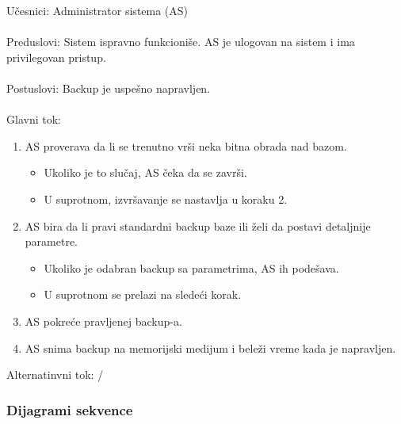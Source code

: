 \label{su: backup}
\noindent U\v cesnici: Administrator sistema (AS)
\\
\\ Preduslovi: Sistem ispravno funkcioni\v se. AS je ulogovan na sistem i ima privilegovan pristup.
\\
\\ Postuslovi: Backup je uspe\v sno napravljen.
\\
\\ Glavni tok:
\begin{enumerate}
	\item AS proverava da li se trenutno vr\v si neka bitna obrada nad bazom.
	\begin{itemize}
		\item Ukoliko je to slu\v caj, AS \v ceka da se zavr\v si.
		\item U suprotnom, izvr\v savanje se nastavlja u koraku 2.
	\end{itemize}
	\item AS bira da li pravi standardni backup baze ili \v zeli da postavi detaljnije parametre.
	\begin{itemize}
		\item Ukoliko je odabran backup sa parametrima, AS ih pode\v sava.
		\item U suprotnom se prelazi na slede\' ci korak.
	\end{itemize}
	\item AS pokre\' ce pravljenej backup-a.
	\item AS snima backup na memorijski medijum i bele\v zi vreme kada je napravljen.
\end{enumerate}

\noindent Alternatinvni tok: /

\subsubsection{Dijagrami sekvence}

